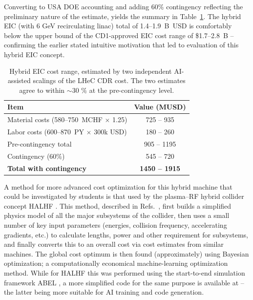 \documentclass[%
               refpage,       %
               biblatex,     %
               hyphens,      %
               ]{jacow}
\begin{document}
Converting to USA DOE accounting and  adding 60\% contingency reflecting the preliminary nature of the 
estimate, yields the summary in Table~\ref{tab:cost-doe}. The hybrid EIC  (with 6 GeV recirculating linac) total of 
1.4--1.9~B~USD is comfortably below the upper bound of the CD1-approved 
EIC cost range of \$1.7--2.8~B -- confirming the earlier stated intuitive motivation that led to  
evaluation of this hybrid EIC concept.

\begin{table}[!hbt]
\centering
\caption{Hybrid EIC cost range, estimated by two independent AI-assisted scalings of the LHeC CDR cost. The two estimates agree to within $\sim$30 \% at the pre-contingency level.}
\label{tab:cost-doe}
\begin{tabular}{lc}
\toprule
\textbf{Item} & \textbf{Value (MUSD)} \\
\midrule
Material costs (580--750~MCHF $\times$ 1.25)\!\!\!\!\!\!  & 725 -- 935 \\
Labor costs (600--870~PY $\times$ 300k USD)\!\!\!\!\!\!   & 180 -- 260 \\
Pre-contingency total                    & 905 -- 1195 \\
Contingency (60\%)                       & 545 -- 720 \\
\textbf{Total with contingency}          & \textbf{1450 -- 1915} \\
\bottomrule
\end{tabular}
\end{table}


A method for more advanced cost optimization for this hybrid machine that could be investigated by students is that used by the plasma--RF hybrid collider concept HALHF \cite{HALHF2023}. This method, described in Refs.~\cite{HALHF_ESSPU,HALHF_IPAC}, first builds a simplified physics model of all the major subsystems of the collider, then uses a small number of key input parameters (energies, collision frequency, accelerating gradients, etc.) to calculate lengths, power and other requirement for subsystems, and finally converts this to an overall cost via cost estimates from similar machines. The global cost optimum is then found (approximately) using Bayesian optimization; a computationally economical machine-learning optimization method. While for HALHF this was performed using the start-to-end simulation framework ABEL \cite{ABEL,ABEL_GITHUB}, a more simplified code for the same purpose is available at \cite{COSTMODEL} -- the latter being more suitable for AI training and code generation.
\end{document}
